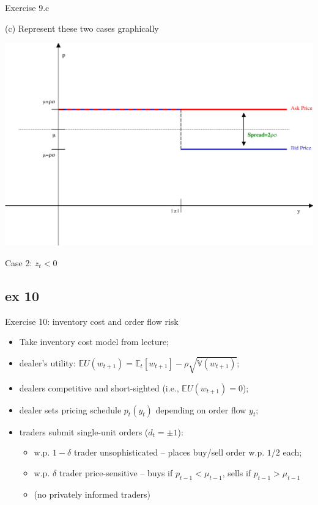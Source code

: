 \documentclass[english,10pt]{beamer}
\begin{document}
\begin{frame}{Exercise 9.c}
	\begin{exampleblock}{}
		(c) Represent these two cases graphically
	\end{exampleblock}
	\centering
	\includegraphics[scale=0.2]{pics/ex9c_2}
	
	Case 2: $z_t < 0$
\end{frame}




\subsection{ex 10}

\begin{frame}{Exercise 10: inventory cost and order flow risk}
	\begin{itemize}
		\item Take inventory cost model from lecture;
		\item dealer's utility: $\mathbb{E}U(w_{t+1}) = \mathbb{E}_t [w_{t+1}] - \rho \sqrt{\mathbb{V}(w_{t+1})}$;
		\item dealers competitive and short-sighted (i.e., $\mathbb{E}U(w_{t+1})=0$);
		\item dealer sets pricing schedule $p_t(y_t)$ depending on order flow $y_t$;
		\item traders submit single-unit orders ($d_t = \pm 1$):
		\begin{itemize}
			\item w.p. $1-\delta$ trader unsophisticated -- places buy/sell order w.p. $1/2$ each;
			\item w.p. $\delta$ trader price-sensitive -- buys if $p_{t-1} < \mu_{t-1}$, sells if $p_{t-1} > \mu_{t-1}$
			\item (no privately informed traders)
		\end{itemize}
	\end{itemize}
\end{frame}
\end{document}

